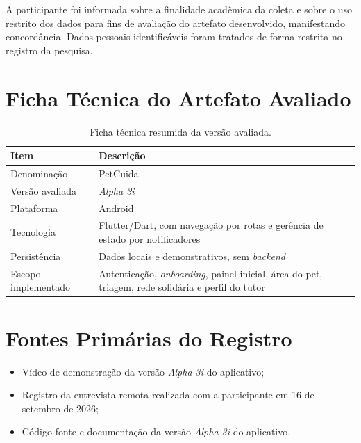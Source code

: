 \documentclass[12pt,a4paper]{article}
\begin{document}
A participante foi informada sobre a finalidade acadêmica da coleta e sobre o uso restrito
dos dados para fins de avaliação do artefato desenvolvido, manifestando concordância.
Dados pessoais identificáveis foram tratados de forma restrita no registro da pesquisa.

\section{Ficha Técnica do Artefato Avaliado}

\begin{table}[h!]
\centering
\small
\begin{tabular}{@{}>{\raggedright\arraybackslash}p{4.6cm}>{\raggedright\arraybackslash}p{9.0cm}@{}}
\toprule
\textbf{Item} & \textbf{Descrição} \\
\midrule
Denominação & PetCuida \\
Versão avaliada & \textit{Alpha 3i} \\
Plataforma & Android \\
Tecnologia & Flutter/Dart, com navegação por rotas e gerência de estado por notificadores \\
Persistência & Dados locais e demonstrativos, sem \textit{backend} \\
Escopo implementado & Autenticação, \textit{onboarding}, painel inicial, área do pet, triagem, rede solidária e perfil do tutor \\
\bottomrule
\end{tabular}
\caption{Ficha técnica resumida da versão avaliada.}
\end{table}

\section{Fontes Primárias do Registro}

\begin{itemize}[leftmargin=*]
  \item Vídeo de demonstração da versão \textit{Alpha 3i} do aplicativo;
  \item Registro da entrevista remota realizada com a participante em 16 de setembro
        de 2026;
  \item Código-fonte e documentação da versão \textit{Alpha 3i} do aplicativo.
\end{itemize}
\end{document}

